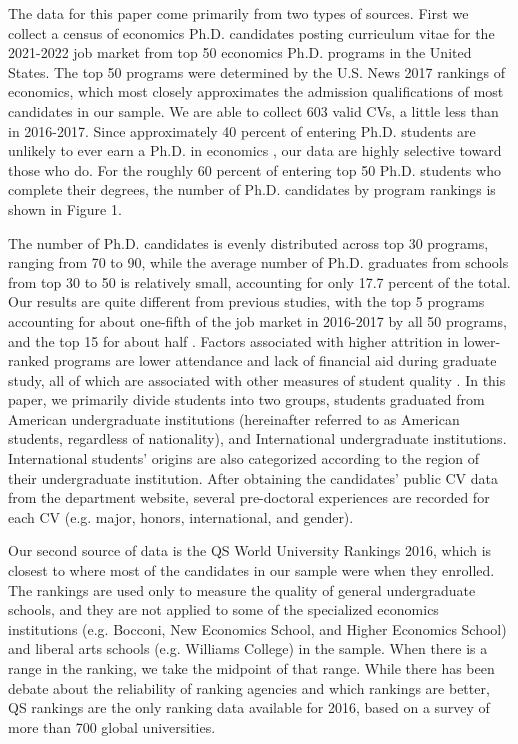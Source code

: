 \documentclass[12pt]{article}
\begin{document}
The data for this paper come primarily from two types of sources. First we collect a census of economics Ph.D. candidates posting curriculum vitae for the 2021-2022 job market from top 50 economics Ph.D. programs in the United States. The top 50 programs were determined by the U.S. News 2017 rankings of economics, which most closely approximates the admission qualifications of most candidates in our sample. We are able to collect 603 valid CVs, a little less than in 2016-2017. Since approximately 40 percent of entering Ph.D. students are unlikely to ever earn a Ph.D. in economics \citet{stock2011}, our data are highly selective toward those who do.  For the roughly 60 percent of entering top 50 Ph.D. students who complete their degrees, the number of Ph.D. candidates by program rankings is shown in Figure 1.

The number of Ph.D. candidates is evenly distributed across top 30 programs, ranging from 70 to 90, while the average number of Ph.D. graduates from schools from top 30 to 50 is relatively small, accounting for only 17.7 percent of the total. Our results are quite different from previous studies, with the top 5 programs accounting for about one-fifth of the job market in 2016-2017 by all 50 programs, and the top 15 for about half \citep{pathtoeconphd}. Factors associated with higher attrition in lower-ranked programs are lower attendance and lack of financial aid during graduate study, all of which are associated with other measures of student quality \citep{stock2014}. In this paper, we primarily divide students into two groups, students graduated from American undergraduate institutions (hereinafter referred to as American students, regardless of nationality), and International undergraduate institutions. International students’ origins are also categorized according to the region of their undergraduate institution. After obtaining the candidates’ public CV data from the department website, several pre-doctoral experiences are recorded for each CV (e.g. major, honors, international, and gender).

Our second source of data is the QS World University Rankings 2016, which is closest to where most of the candidates in our sample were when they enrolled. The rankings are used only to measure the quality of general undergraduate schools, and they are not applied to some of the specialized economics institutions (e.g. Bocconi, New Economics School, and Higher Economics School)  and liberal arts schools (e.g. Williams College) in the sample. When there is a range in the ranking, we take the midpoint of that range. While there has been debate about the reliability of ranking agencies and which rankings are better, QS rankings are the only ranking data available for 2016, based on a survey of more than 700 global universities.
\end{document}
